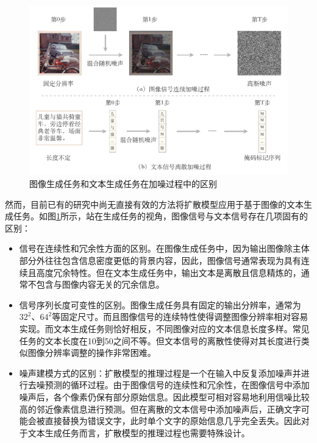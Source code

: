 \begin{figure}
  \centering
  \includegraphics[width=1.0\linewidth]{figures/ddcap-img-text-diff.pdf}
  \caption{图像生成任务和文本生成任务在加噪过程中的区别}
  \label{fig:ddcap-img-text-diff}
\end{figure}


然而，目前已有的研究中尚无直接有效的方法将扩散模型应用于基于图像的文本生成任务\cite{karpathy2015deep, vinyals2015show}。如图\ref{fig:ddcap-img-text-diff}所示，站在生成任务的视角，图像信号与文本信号存在几项固有的区别：
\begin{itemize}
    \item 信号在连续性和冗余性方面的区别。在图像生成任务中，因为输出图像除主体部分外往往包含信息密度更低的背景内容，因此，图像信号通常表现为具有连续且高度冗余特性。但在文本生成任务中，输出文本是离散且信息精炼的，通常不包含与图像内容无关的冗余信息。
    \item 信号序列长度可变性的区别。图像生成任务具有固定的输出分辨率，通常为$32^2$、$64^2$等固定尺寸。而且图像信号的连续特性使得调整图像分辨率相对容易实现\cite{dall-e2,super-resolution}。而文本生成任务则恰好相反，不同图像对应的文本信息长度多样。常见任务的文本长度在10到50之间不等。但文本信号的离散性使得对其长度进行类似图像分辨率调整的操作非常困难。
    \item 噪声建模方式的区别：扩散模型的推理过程是一个在输入中反复添加噪声并进行去噪预测的循环过程。由于图像信号的连续性和冗余性，在图像信号中添加噪声后，各个像素仍保有部分原始信息。因此模型可相对容易地利用信噪比较高的邻近像素信息进行预测。但在离散的文本信号中添加噪声后，正确文字可能会被直接替换为错误文字，此时单个文字的原始信息几乎完全丢失。因此对于文本生成任务而言，扩散模型的推理过程也需要特殊设计。
\end{itemize}

